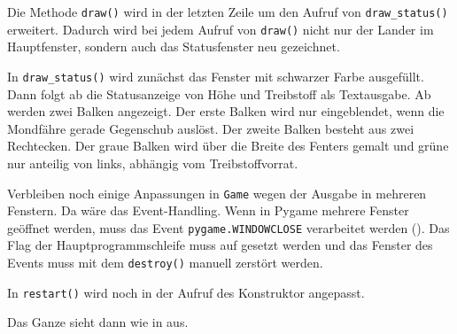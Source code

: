 
Die Methode \texttt{draw()} wird in der letzten Zeile um den Aufruf von \texttt{draw\_status()} erweitert. Dadurch wird bei jedem Aufruf von \texttt{draw()} nicht nur der Lander im Hauptfenster, sondern auch das Statusfenster neu gezeichnet.


In \texttt{draw\_status()} wird zunächst das Fenster mit schwarzer Farbe ausgefüllt. Dann folgt ab  die Statusanzeige von Höhe und Treibstoff als Textausgabe. Ab  werden zwei Balken angezeigt. Der erste Balken wird nur eingeblendet, wenn die Mondfähre gerade Gegenschub auslöst. Der zweite Balken besteht aus zwei Rechtecken. Der graue Balken wird über die Breite des Fenters gemalt und grüne nur anteilig von links, abhängig vom Treibstoffvorrat.  


Verbleiben noch einige Anpassungen in \texttt{Game} wegen der Ausgabe in mehreren Fenstern. Da wäre das Event-Handling. Wenn in Pygame mehrere Fenster geöffnet werden, muss das Event \texttt{pygame.WINDOWCLOSE} verarbeitet werden (). Das Flag der Hauptprogrammschleife muss auf \false{} gesetzt werden und das Fenster des Events muss mit dem \texttt{destroy()} manuell zerstört werden. 


In \texttt{restart()} wird noch in  der Aufruf des Konstruktor angepasst.


Das Ganze sieht dann wie in  aus.



